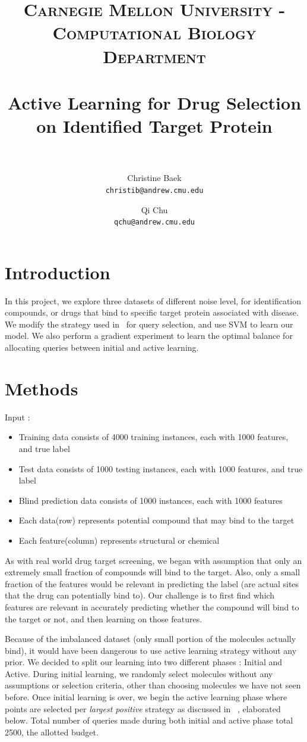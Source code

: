 \documentclass[paper=a4, fontsize=11pt]{scrartcl}
\title{
    \usefont{OT1}{bch}{b}{n}
    \normalfont \normalsize \textsc{Carnegie Mellon University - Computational Biology Department} \\ [25pt]
    \horrule{0.5pt} \\[0.4cm]
    \huge Active Learning for Drug Selection\\ on Identified Target Protein \\
    \horrule{2pt} \\[0.5cm]
}
\author{
  Christine Baek\\
  \normalsize\texttt{christib@andrew.cmu.edu}
  \and
  Qi Chu\\
  \normalsize\texttt{qchu@andrew.cmu.edu}
  \date{}
}
\date{}
\numberwithin{equation}{section}    %
\numberwithin{figure}{section}      %
\numberwithin{table}{section}       %
\numberwithin{equation}{section}    %
\numberwithin{figure}{section}      %
\numberwithin{table}{section}       %
\begin{document}
\maketitle
\section{Introduction}
In this project, we explore three datasets of different noise level, for identification compounds, or drugs that bind to specific target protein associated with disease. We modify the strategy used in~\cite{ref:warmuth} for query selection, and use SVM to learn our model. We also perform a gradient experiment to learn the optimal balance for allocating queries between initial and active learning. 



\section{Methods}

Input :
\begin{itemize}
\item Training data consists of 4000 training instances, each with 1000 features, and true label 
\item Test data consists of 1000 testing instances, each with 1000 features, and true label
\item Blind prediction data consists of 1000 instances, each with 1000 features
\item Each data(row) represents potential compound that may bind to the target
\item Each feature(column) represents structural or chemical 
\end{itemize}




As with real world drug target screening, we began with assumption that only an extremely small fraction of compounds will bind to the target. Also, only a small fraction of the features would be relevant in predicting the label (are actual sites that the drug can potentially bind to). Our challenge is to first find which features are relevant in accurately predicting whether the compound will bind to the target or not, and then learning on those features.

Because of the imbalanced dataset (only small portion of the molecules actually bind), it would have been dangerous to use active learning strategy without any prior. We decided to split our learning into two different phases : Initial and Active. During initial learning, we randomly select molecules without any assumptions or selection criteria, other than choosing molecules we have not seen before. Once initial learning is over, we begin the active learning phase where points are selected per \textit{largest positive} strategy as discussed in ~\cite{ref:warmuth}, elaborated below. Total number of queries made during both initial and active phase total 2500, the allotted budget. 
\end{document}
